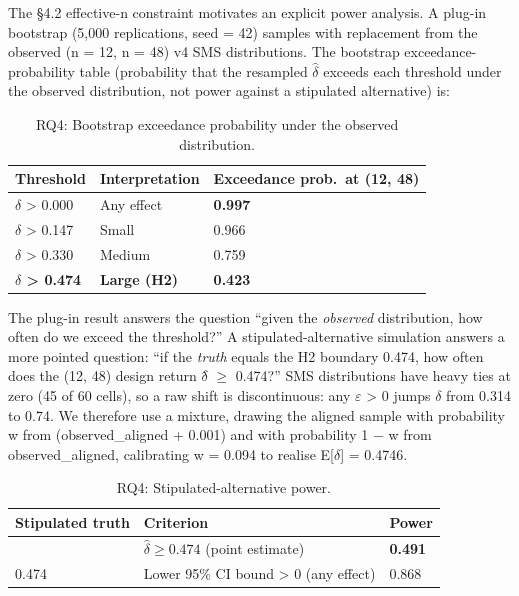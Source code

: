 \documentclass[acmsmall,screen,review]{acmart}
\begin{document}
The §4.2 effective-n constraint motivates an explicit power analysis. A
plug-in bootstrap (5,000 replications, seed = 42) samples with
replacement from the observed (n = 12, n = 48) v4 SMS distributions. The
bootstrap exceedance-probability table (probability that the resampled
$\hat\delta$ exceeds each threshold under the observed distribution, not
power against a stipulated alternative) is:

{\def\LTcaptype{table} %
\begin{longtable}[]{@{}lll@{}}
\caption{RQ4: Bootstrap exceedance probability under the observed
distribution.}\label{tab:p2-10}\\
\toprule\noalign{}
Threshold & Interpretation & Exceedance prob.\ at (12, 48) \\
\midrule\noalign{}
\endhead
\bottomrule\noalign{}
\endlastfoot
$\delta$ \textgreater{} 0.000 & Any effect & \textbf{0.997} \\
$\delta$ \textgreater{} 0.147 & Small & 0.966 \\
$\delta$ \textgreater{} 0.330 & Medium & 0.759 \\
\textbf{$\delta$ \textgreater{} 0.474} & \textbf{Large (H2)} &
\textbf{0.423} \\
\end{longtable}
}

The plug-in result answers the question ``given the \emph{observed}
distribution, how often do we exceed the threshold?'' A
stipulated-alternative simulation answers a more pointed question: ``if
the \emph{truth} equals the H2 boundary 0.474, how often does the (12,
48) design return $\delta$̂ $\geq$ 0.474?'' SMS distributions have heavy ties at zero
(45 of 60 cells), so a raw shift is discontinuous: any $\varepsilon$ \textgreater{}
0 jumps $\delta$ from 0.314 to 0.74. We therefore use a mixture, drawing the
aligned sample with probability w from (observed\_aligned + 0.001) and
with probability 1 − w from observed\_aligned, calibrating w = 0.094 to
realise E{[}$\delta${]} = 0.4746.

{\def\LTcaptype{table} %
\begin{longtable}[]{@{}lll@{}}
\caption{RQ4: Stipulated-alternative power.}\label{tab:p2-11}\\
\toprule\noalign{}
Stipulated truth & Criterion & Power \\
\midrule\noalign{}
\endfirsthead
\endhead
\bottomrule\noalign{}
\endlastfoot
0.474 & $\hat{\delta} \geq 0.474$ (point estimate) & \textbf{0.491} \\
0.474 & Lower 95\% CI bound \textgreater{} 0 (any effect) & 0.868 \\
\end{longtable}
}
\end{document}
